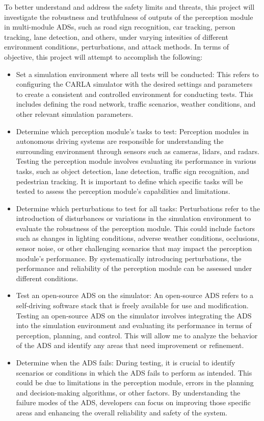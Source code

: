 \documentclass[a4paper]{article}
\begin{document}
\noindent To better understand and address the safety limits and threats, this project will investigate the robustness and truthfulness of outputs of the perception module in multi-module ADSs, such as road sign recognition, car tracking, person tracking, lane detection, and others, under varying intesities of different environment conditions, perturbations, and attack methods.
In terms of objective, this project will attempt to accomplish the following:
\begin{itemize}
  \item Set a simulation environment where all tests will be conducted: This refers to configuring the CARLA simulator with the desired settings and parameters to create a consistent and controlled environment for conducting tests. This includes defining the road network, traffic scenarios, weather conditions, and other relevant simulation parameters.
  \item Determine which perception module's tasks to test: Perception modules in autonomous driving systems are responsible for understanding the surrounding environment through sensors such as cameras, lidars, and radars. Testing the perception module involves evaluating its performance in various tasks, such as object detection, lane detection, traffic sign recognition, and pedestrian tracking. It is important to define which specific tasks will be tested to assess the perception module's capabilities and limitations.
  \item Determine which perturbations to test for all tasks: Perturbations refer to the introduction of disturbances or variations in the simulation environment to evaluate the robustness of the perception module. This could include factors such as changes in lighting conditions, adverse weather conditions, occlusions, sensor noise, or other challenging scenarios that may impact the perception module's performance. By systematically introducing perturbations, the performance and reliability of the perception module can be assessed under different conditions.
  \item Test an open-source ADS on the simulator: An open-source ADS refers to a self-driving software stack that is freely available for use and modification. Testing an open-source ADS on the simulator involves integrating the ADS into the simulation environment and evaluating its performance in terms of perception, planning, and control. This will allow me to analyze the behavior of the ADS and identify any areas that need improvement or refinement.
  \item Determine when the ADS fails: During testing, it is crucial to identify scenarios or conditions in which the ADS fails to perform as intended. This could be due to limitations in the perception module, errors in the planning and decision-making algorithms, or other factors. By understanding the failure modes of the ADS, developers can focus on improving those specific areas and enhancing the overall reliability and safety of the system.

\end{itemize}
\end{document}
